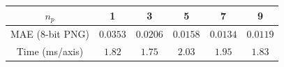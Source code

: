 \begin{tabular}{cccccc}
\toprule
$n_p$ & 1 & 3 & 5 & 7 & 9 \\
\midrule
MAE (8-bit PNG) & $0.0353$ & $0.0206$ & $\mathbf{0.0158}$ & $0.0134$ & $0.0119$ \\
Time (ms/axis)  & $1.82$ & $1.75$ & $2.03$ & $1.95$ & $1.83$ \\
\bottomrule
\end{tabular}
